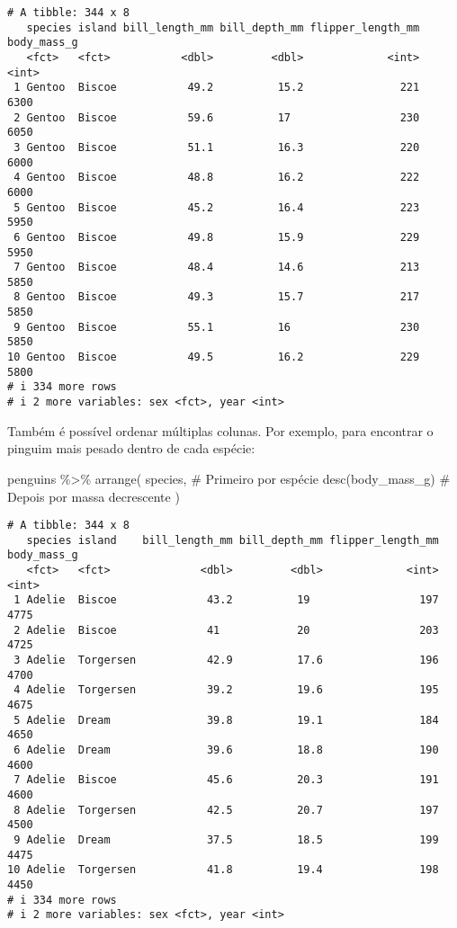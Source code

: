 \documentclass[
  12pt,
  letterpaper,
  DIV=11,
  numbers=noendperiod]{scrreprt}
\newenvironment{Shaded}{\begin{snugshade}}{\end{snugshade}}
\newcommand{\CommentTok}[1]{\textcolor[rgb]{0.37,0.37,0.37}{#1}}
\newcommand{\FunctionTok}[1]{\textcolor[rgb]{0.28,0.35,0.67}{#1}}
\newcommand{\NormalTok}[1]{\textcolor[rgb]{0.00,0.23,0.31}{#1}}
\newcommand{\SpecialCharTok}[1]{\textcolor[rgb]{0.37,0.37,0.37}{#1}}
\begin{document}
\begin{verbatim}
# A tibble: 344 x 8
   species island bill_length_mm bill_depth_mm flipper_length_mm body_mass_g
   <fct>   <fct>           <dbl>         <dbl>             <int>       <int>
 1 Gentoo  Biscoe           49.2          15.2               221        6300
 2 Gentoo  Biscoe           59.6          17                 230        6050
 3 Gentoo  Biscoe           51.1          16.3               220        6000
 4 Gentoo  Biscoe           48.8          16.2               222        6000
 5 Gentoo  Biscoe           45.2          16.4               223        5950
 6 Gentoo  Biscoe           49.8          15.9               229        5950
 7 Gentoo  Biscoe           48.4          14.6               213        5850
 8 Gentoo  Biscoe           49.3          15.7               217        5850
 9 Gentoo  Biscoe           55.1          16                 230        5850
10 Gentoo  Biscoe           49.5          16.2               229        5800
# i 334 more rows
# i 2 more variables: sex <fct>, year <int>
\end{verbatim}

\noindent Também é possível ordenar múltiplas colunas. Por exemplo, para
encontrar o pinguim mais pesado dentro de cada espécie:

\begin{Shaded}
\begin{Highlighting}[]
\NormalTok{penguins }\SpecialCharTok{\%\textgreater{}\%} 
  \FunctionTok{arrange}\NormalTok{(}
\NormalTok{    species, }\CommentTok{\# Primeiro por espécie}
    \FunctionTok{desc}\NormalTok{(body\_mass\_g) }\CommentTok{\# Depois por massa decrescente}
\NormalTok{  )}
\end{Highlighting}
\end{Shaded}

\begin{verbatim}
# A tibble: 344 x 8
   species island    bill_length_mm bill_depth_mm flipper_length_mm body_mass_g
   <fct>   <fct>              <dbl>         <dbl>             <int>       <int>
 1 Adelie  Biscoe              43.2          19                 197        4775
 2 Adelie  Biscoe              41            20                 203        4725
 3 Adelie  Torgersen           42.9          17.6               196        4700
 4 Adelie  Torgersen           39.2          19.6               195        4675
 5 Adelie  Dream               39.8          19.1               184        4650
 6 Adelie  Dream               39.6          18.8               190        4600
 7 Adelie  Biscoe              45.6          20.3               191        4600
 8 Adelie  Torgersen           42.5          20.7               197        4500
 9 Adelie  Dream               37.5          18.5               199        4475
10 Adelie  Torgersen           41.8          19.4               198        4450
# i 334 more rows
# i 2 more variables: sex <fct>, year <int>
\end{verbatim}
\end{document}
